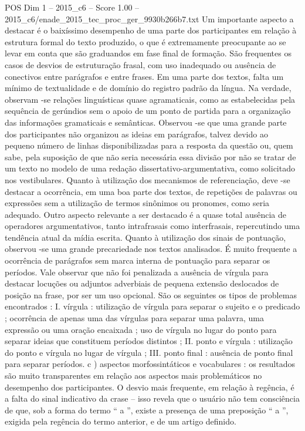 \begin{textsample}{POS Dim 1 – 2015\_c6 – Score 1.00 – 2015\_c6/enade\_2015\_tec\_proc\_ger\_9930b266b7.txt}
Um importante aspecto a destacar é o baixíssimo desempenho de uma parte dos participantes em relação à estrutura formal do texto produzido, o que é extremamente preocupante ao se levar em conta que são graduandos em fase final de formação.
São frequentes os casos de desvios de estruturação frasal, com uso inadequado ou ausência de conectivos entre parágrafos e entre frases.
Em uma parte dos textos, falta um mínimo de textualidade e de domínio do registro padrão da língua.
Na verdade, observam -se relações linguísticas quase agramaticais, como as estabelecidas pela sequência de gerúndios sem o apoio de um ponto de partida para a organização das informações gramaticais e semânticas.
Observou -se que uma grande parte dos participantes não organizou as ideias em parágrafos, talvez devido ao pequeno número de linhas disponibilizadas para a resposta da questão ou, quem sabe, pela suposição de que não seria necessária essa divisão por não se tratar de um texto no modelo de uma redação dissertativo-argumentativa, como solicitado nos vestibulares.
Quanto à utilização dos mecanismos de referenciação, deve -se destacar a ocorrência, em uma boa parte dos textos, de repetições de palavras ou expressões sem a utilização de termos sinônimos ou pronomes, como seria adequado.
Outro aspecto relevante a ser destacado é a quase total ausência de operadores argumentativos, tanto intrafrasais como interfrasais, repercutindo uma tendência atual da mídia escrita.
Quanto à utilização dos sinais de pontuação, observou -se uma grande precariedade nos textos analisados.
É muito frequente a ocorrência de parágrafos sem marca interna de pontuação para separar os períodos.
Vale observar que não foi penalizada a ausência de vírgula para destacar locuções ou adjuntos adverbiais de pequena extensão deslocados de posição na frase, por ser um uso opcional.
São os seguintes os tipos de problemas encontrados : I. vírgula : utilização de vírgula para separar o sujeito e o predicado ; ocorrência de apenas uma das vírgulas para separar uma palavra, uma expressão ou uma oração encaixada ; uso de vírgula no lugar do ponto para separar ideias que constituem períodos distintos ; II. ponto e vírgula : utilização do ponto e vírgula no lugar de vírgula ; III. ponto final : ausência de ponto final para separar períodos. c ) aspectos morfossintáticos e vocabulares : os resultados são muito transparentes em relação aos aspectos mais problemáticos no desempenho dos participantes.
O desvio mais frequente, em relação à regência, é a falta do sinal indicativo da crase – isso revela que o usuário não tem consciência de que, sob a forma do termo “ a ”, existe a presença de uma preposição “ a ”, exigida pela regência do termo anterior, e de um artigo definido.

\end{textsample}
